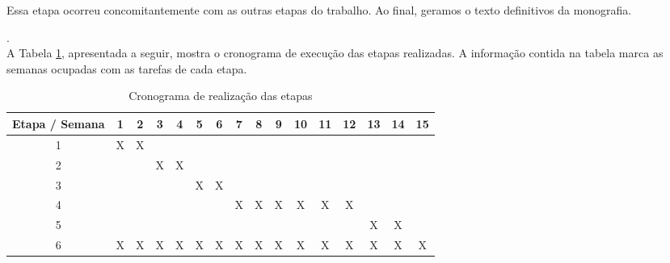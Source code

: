 Essa etapa ocorreu concomitantemente com as outras etapas do trabalho. Ao final, geramos o texto definitivos da monografia.

. \\

A Tabela \ref{tabCronograma}, apresentada a seguir, mostra o cronograma de execução das etapas realizadas. A informação contida na tabela marca as semanas ocupadas com as tarefas de cada etapa.

    \begin{table}[h]
        \begin{center}
    		\begin{tabular}{|c|c|c|c|c|c|c|c|c|c|c|c|c|c|c|c|}
    			\hline
                \textbf{Etapa / Semana} & 1 & 2 & 3 & 4 & 5 & 6 & 7 & 8 & 9 & 10 & 11 & 12 & 13 & 14 & 15\\ \hline
                1 & X & X &   &   &   &   &   &   &   &   &   &   &   &   &  \\ \hline
                2 &   &   & X & X &   &   &   &   &   &   &   &   &   &   &  \\ \hline
                3 &   &   &   &   & X & X &   &   &   &   &   &   &   &   &  \\ \hline
                4 &   &   &   &   &   &   & X & X & X & X & X & X &   &   &  \\ \hline
                5 &   &   &   &   &   &   &   &   &   &   &   &   & X & X &  \\ \hline
                6 & X & X & X & X & X & X & X & X & X & X & X & X & X & X & X\\ \hline
    		\end{tabular}
    		\caption{Cronograma de realização das etapas}
        	\label{tabCronograma}
    	\end{center}
    \end{table}
